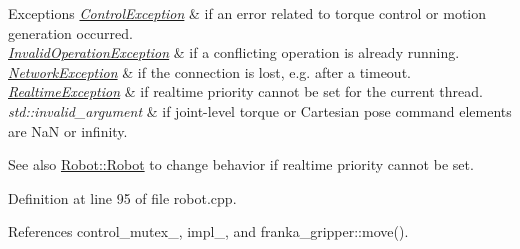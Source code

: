 \begin{DoxyExceptions}{Exceptions}
{\em \hyperlink{structfranka_1_1ControlException}{Control\+Exception}} & if an error related to torque control or motion generation occurred. \\
\hline
{\em \hyperlink{structfranka_1_1InvalidOperationException}{Invalid\+Operation\+Exception}} & if a conflicting operation is already running. \\
\hline
{\em \hyperlink{structfranka_1_1NetworkException}{Network\+Exception}} & if the connection is lost, e.\+g. after a timeout. \\
\hline
{\em \hyperlink{structfranka_1_1RealtimeException}{Realtime\+Exception}} & if realtime priority cannot be set for the current thread. \\
\hline
{\em std\+::invalid\+\_\+argument} & if joint-\/level torque or Cartesian pose command elements are NaN or infinity.\\
\hline
\end{DoxyExceptions}
\begin{DoxySeeAlso}{See also}
\hyperlink{classfranka_1_1Robot_ae63bc19390df3d54f3a270814df35eb6}{Robot\+::\+Robot} to change behavior if realtime priority cannot be set. 
\end{DoxySeeAlso}


Definition at line 95 of file robot.\+cpp.



References control\+\_\+mutex\+\_\+, impl\+\_\+, and franka\+\_\+gripper\+::move().


